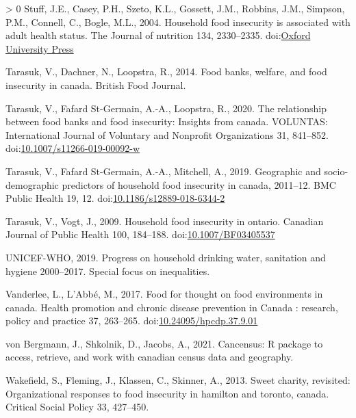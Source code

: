 \documentclass[]{elsarticle} %
\newlength{\cslhangindent}
\newenvironment{CSLReferences}[3] %
 {%
  \setlength{\parindent}{0pt}
  \ifodd #1 \everypar{\setlength{\hangindent}{\cslhangindent}}\ignorespaces\fi
  \ifnum #2 > 0
  \setlength{\parskip}{#2\baselineskip}
  \fi
 }%
 {}
\begin{document}
\begin{CSLReferences}{1}{0}
\leavevmode\hypertarget{ref-stuff2004household}{}%
Stuff, J.E., Casey, P.H., Szeto, K.L., Gossett, J.M., Robbins, J.M.,
Simpson, P.M., Connell, C., Bogle, M.L., 2004. Household food insecurity
is associated with adult health status. The Journal of nutrition 134,
2330--2335.
doi:\href{https://doi.org/Oxford\%20University\%20Press}{Oxford University Press}

\leavevmode\hypertarget{ref-tarasuk2014food}{}%
Tarasuk, V., Dachner, N., Loopstra, R., 2014. Food banks, welfare, and
food insecurity in canada. British Food Journal.

\leavevmode\hypertarget{ref-tarasuk2020relationship}{}%
Tarasuk, V., Fafard St-Germain, A.-A., Loopstra, R., 2020. The
relationship between food banks and food insecurity: Insights from
canada. VOLUNTAS: International Journal of Voluntary and Nonprofit
Organizations 31, 841--852.
doi:\href{https://doi.org/10.1007/s11266-019-00092-w}{10.1007/s11266-019-00092-w}

\leavevmode\hypertarget{ref-tarasuk2019geographic}{}%
Tarasuk, V., Fafard St-Germain, A.-A., Mitchell, A., 2019. Geographic
and socio-demographic predictors of household food insecurity in canada,
2011--12. BMC Public Health 19, 12.
doi:\href{https://doi.org/10.1186/s12889-018-6344-2}{10.1186/s12889-018-6344-2}

\leavevmode\hypertarget{ref-tarasuk2009household}{}%
Tarasuk, V., Vogt, J., 2009. Household food insecurity in ontario.
Canadian Journal of Public Health 100, 184--188.
doi:\href{https://doi.org/10.1007/BF03405537}{10.1007/BF03405537}

\leavevmode\hypertarget{ref-world2019progress}{}%
UNICEF-WHO, 2019. Progress on household drinking water, sanitation and
hygiene 2000--2017. Special focus on inequalities.

\leavevmode\hypertarget{ref-vanderlee2017food}{}%
Vanderlee, L., L'Abbé, M., 2017. Food for thought on food environments
in canada. Health promotion and chronic disease prevention in Canada :
research, policy and practice 37, 263--265.
doi:\href{https://doi.org/10.24095/hpcdp.37.9.01}{10.24095/hpcdp.37.9.01}

\leavevmode\hypertarget{ref-vonBergmann2021cancensus}{}%
von Bergmann, J., Shkolnik, D., Jacobs, A., 2021. Cancensus: R package
to access, retrieve, and work with canadian census data and geography.

\leavevmode\hypertarget{ref-wakefield2013sweet}{}%
Wakefield, S., Fleming, J., Klassen, C., Skinner, A., 2013. Sweet
charity, revisited: Organizational responses to food insecurity in
hamilton and toronto, canada. Critical Social Policy 33, 427--450.


\end{CSLReferences}
\end{document}

